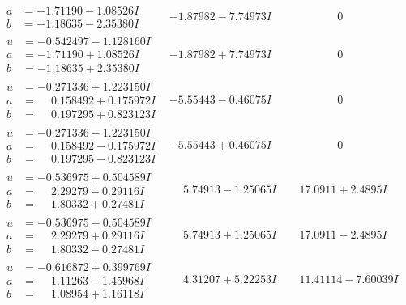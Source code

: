 \documentclass[1p]{elsarticle_modified}
\theoremstyle{definition}
\begin{document}
$$\begin{array}{c|c|c}
\begin{aligned}
a &= -1.71190 - 1.08526 I \\
b &= -1.18635 - 2.35380 I\end{aligned}
 & -1.87982 - 7.74973 I & \phantom{-0.000000 } 0 \\ \hline\begin{aligned}
u &= -0.542497 - 1.128160 I \\
a &= -1.71190 + 1.08526 I \\
b &= -1.18635 + 2.35380 I\end{aligned}
 & -1.87982 + 7.74973 I & \phantom{-0.000000 } 0 \\ \hline\begin{aligned}
u &= -0.271336 + 1.223150 I \\
a &= \phantom{-}0.158492 + 0.175972 I \\
b &= \phantom{-}0.197295 + 0.823123 I\end{aligned}
 & -5.55443 - 0.46075 I & \phantom{-0.000000 } 0 \\ \hline\begin{aligned}
u &= -0.271336 - 1.223150 I \\
a &= \phantom{-}0.158492 - 0.175972 I \\
b &= \phantom{-}0.197295 - 0.823123 I\end{aligned}
 & -5.55443 + 0.46075 I & \phantom{-0.000000 } 0 \\ \hline\begin{aligned}
u &= -0.536975 + 0.504589 I \\
a &= \phantom{-}2.29279 - 0.29116 I \\
b &= \phantom{-}1.80332 + 0.27481 I\end{aligned}
 & \phantom{-}5.74913 - 1.25065 I & \phantom{-}17.0911 + 2.4895 I \\ \hline\begin{aligned}
u &= -0.536975 - 0.504589 I \\
a &= \phantom{-}2.29279 + 0.29116 I \\
b &= \phantom{-}1.80332 - 0.27481 I\end{aligned}
 & \phantom{-}5.74913 + 1.25065 I & \phantom{-}17.0911 - 2.4895 I \\ \hline\begin{aligned}
u &= -0.616872 + 0.399769 I \\
a &= \phantom{-}1.11263 - 1.45968 I \\
b &= \phantom{-}1.08954 + 1.16118 I\end{aligned}
 & \phantom{-}4.31207 + 5.22253 I & \phantom{-}11.41114 - 7.60039 I \\ \hline\begin{aligned}

\end{aligned}
\end{array}$$
\end{document}
